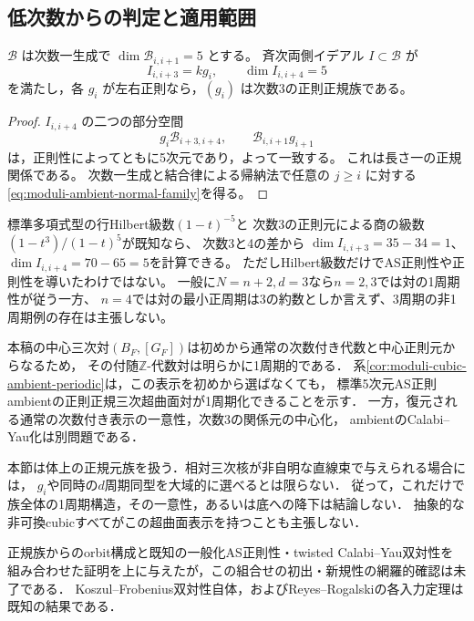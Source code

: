 \subsection{低次数からの判定と適用範囲}
\begin{proposition}[低次数の核からの正規性判定]\label{prop:moduli-cubic-normal-criterion}
$\mathcal B$ は次数一生成で
$\dim\mathcal B_{i,i+1}=5$ とする。
斉次両側イデアル $I\subset\mathcal B$ が
\begin{equation}
 I_{i,i+3}=k g_i,\qquad \dim I_{i,i+4}=5
\end{equation}
を満たし，各 $g_i$ が左右正則なら，$(g_i)$ は次数3の正則正規族である。
\end{proposition}
\begin{proof}
$I_{i,i+4}$ の二つの部分空間
\begin{equation}
 g_i\mathcal B_{i+3,i+4},
 \qquad \mathcal B_{i,i+1}g_{i+1}
\end{equation}
は，正則性によってともに5次元であり，よって一致する。
これは長さ一の正規関係である。
次数一生成と結合律による帰納法で任意の $j\geq i$ に対する
\eqref{eq:moduli-ambient-normal-family}を得る。
\end{proof}

標準多項式型の行Hilbert級数$(1-t)^{-5}$と
次数3の正則元による商の級数$(1-t^3)/(1-t)^5$が既知なら、
次数3と4の差から
$\dim I_{i,i+3}=35-34=1$、$\dim I_{i,i+4}=70-65=5$を計算できる。
ただしHilbert級数だけでAS正則性や正則性を導いたわけではない。
一般に$N=n+2,d=3$なら$n=2,3$では対の1周期性が従う一方、
$n=4$では対の最小正周期は3の約数としか言えず、3周期の非1周期例の存在は主張しない。


\begin{remark}[適用範囲と既知結果との関係]
\label{rem:moduli-ambient-pair-scope}
本稿の中心三次対$(B_F,[G_F])$は初めから通常の次数付き代数と中心正則元からなるため，
その付随$\mathbb Z$-代数対は明らかに1周期的である．
系\ref{cor:moduli-cubic-ambient-periodic}は，この表示を初めから選ばなくても，
標準5次元AS正則ambientの正則正規三次超曲面対が1周期化できることを示す．
一方，復元される通常の次数付き表示の一意性，次数3の関係元の中心化，
ambientのCalabi--Yau化は別問題である．

本節は体上の正規元族を扱う．相対三次核が非自明な直線束で与えられる場合には，
$g_i$や同時の$d$周期同型を大域的に選べるとは限らない．
従って，これだけで族全体の1周期構造，その一意性，あるいは底への降下は結論しない．
抽象的な非可換cubicすべてがこの超曲面表示を持つことも主張しない．

正規族からのorbit構成と既知の一般化AS正則性・twisted Calabi--Yau双対性を
組み合わせた証明を上に与えたが，この組合せの初出・新規性の網羅的確認は未了である．
Koszul--Frobenius双対性自体，およびReyes--Rogalskiの各入力定理は既知の結果である．
\end{remark}
